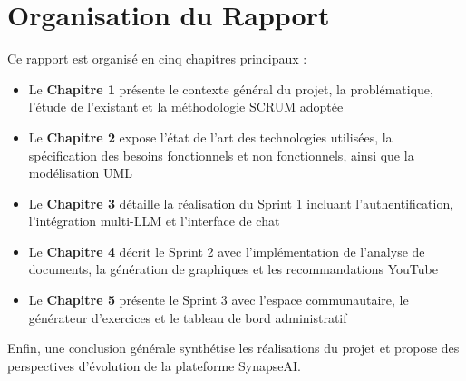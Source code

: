 \section*{Organisation du Rapport}

Ce rapport est organisé en cinq chapitres principaux :

\begin{itemize}
    \item Le \textbf{Chapitre 1} présente le contexte général du projet, la problématique, l'étude de l'existant et la méthodologie SCRUM adoptée
    \item Le \textbf{Chapitre 2} expose l'état de l'art des technologies utilisées, la spécification des besoins fonctionnels et non fonctionnels, ainsi que la modélisation UML
    \item Le \textbf{Chapitre 3} détaille la réalisation du Sprint 1 incluant l'authentification, l'intégration multi-LLM et l'interface de chat
    \item Le \textbf{Chapitre 4} décrit le Sprint 2 avec l'implémentation de l'analyse de documents, la génération de graphiques et les recommandations YouTube
    \item Le \textbf{Chapitre 5} présente le Sprint 3 avec l'espace communautaire, le générateur d'exercices et le tableau de bord administratif
\end{itemize}

Enfin, une conclusion générale synthétise les réalisations du projet et propose des perspectives d'évolution de la plateforme SynapseAI.

